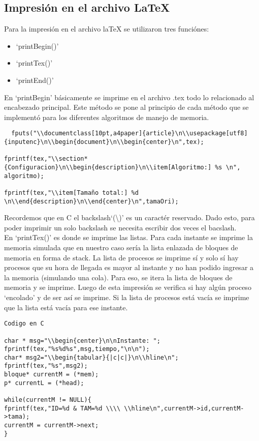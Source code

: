 \documentclass[10pt,a4paper]{article}
\begin{document}
\subsection{Impresión en el archivo LaTeX}
Para la impresión en el archivo laTeX se utilizaron tres funciónes:
\begin{itemize}
	\item `printBegin()'
    \item`printTex()'
	\item`printEnd()'
\end{itemize}
En `printBegin' básicamente se imprime en el archivo .tex todo lo relacionado al encabezado principal. Este método se pone al principio de cada método que se implementó para los diferentes algoritmos de manejo de memoria.
\begin{verbatim}
  fputs("\\documentclass[10pt,a4paper]{article}\n\\usepackage[utf8]{inputenc}\n\\begin{document}\n\\begin{center}\n",tex);
  
fprintf(tex,"\\section*{Configuracion}\n\\begin{description}\n\\item[Algoritmo:] %s \n", algoritmo);

fprintf(tex,"\\item[Tamaño total:] %d \n\\end{description}\n\\end{center}\n",tamaOri);
\end{verbatim}
Recordemos que en C el backslash`(\textbackslash)' es un caractér reservado. Dado esto, para poder imprimir un solo backslash se necesita escribir dos veces el bacslash.
\\
En `printTex()' es donde se imprime las listas.
Para cada instante se imprime la memoria simulada que en nuestro caso sería la lista enlazada de bloques de memoria en forma de stack. La lista de procesos se imprime sí y solo sí hay procesos que su hora de llegada es mayor al instante y no han podido ingresar a la memoria (simulando una cola). Para eso, se itera la lista de bloques de memoria y se imprime. Luego de esta impresión se verifica si hay algún proceso `encolado' y de ser así se imprime.
Si la lista de procesos está vacía se imprime que la lista está vacía para ese instante.
\begin{verbatim}
Codigo en C

char * msg="\\begin{center}\n\nInstante: ";
fprintf(tex,"%s%d%s",msg,tiempo,"\n\n");
char* msg2="\\begin{tabular}{|c|c|}\n\\hline\n";
fprintf(tex,"%s",msg2);
bloque* currentM = (*mem);
p* currentL = (*head);

while(currentM != NULL){
fprintf(tex,"ID=%d & TAM=%d \\\\ \\hline\n",currentM->id,currentM->tama);
currentM = currentM->next;
}
\end{verbatim}
\end{document}
